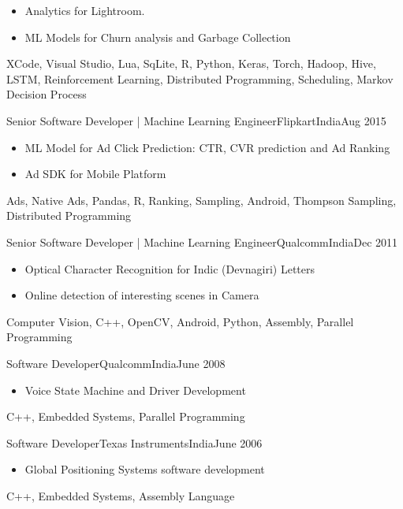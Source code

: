 \begin{experiences}
{\begin{itemize}
  	\item Analytics for Lightroom.
  	
  	\item ML Models for Churn analysis and Garbage Collection
  \end{itemize}
	}
  {XCode, Visual Studio, Lua, SqLite, R, Python, Keras, Torch, Hadoop, Hive, LSTM, Reinforcement Learning, Distributed Programming, Scheduling, Markov Decision Process}
  \emptySeparator
  
   {Senior Software Developer | Machine Learning Engineer}{Flipkart}{India}{Aug 2015}    
  {
  	\begin{itemize}
  		
  		\item ML Model for Ad Click Prediction: CTR, CVR prediction and Ad Ranking
  		
  		\item Ad SDK for Mobile Platform
  	\end{itemize}
  }
{ Ads, Native Ads, Pandas, R, Ranking, Sampling, Android, Thompson Sampling, Distributed Programming}
\emptySeparator

   {Senior Software Developer | Machine Learning Engineer}{Qualcomm}{India}{Dec 2011}    
  {
	\begin{itemize}
		\item Optical Character Recognition for Indic (Devnagiri) Letters
		\item Online detection of interesting scenes in Camera
	\end{itemize}
  }
  { Computer Vision, C++, OpenCV, Android, Python, Assembly, Parallel Programming}
  
  \emptySeparator
 
   {Software Developer}{Qualcomm}{India}{June 2008}    
	{
		\begin{itemize}
			\item Voice State Machine and Driver Development
		\end{itemize}
	}
	{ C++, Embedded Systems, Parallel Programming}

  \emptySeparator  
   {Software Developer}{Texas Instruments}{India}{June 2006}    
	{
		\begin{itemize}
			\item Global Positioning Systems software development
		\end{itemize}
	}
	{ C++, Embedded Systems, Assembly Language}  	
	  
\emptySeparator
  
\end{experiences}

